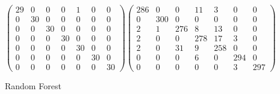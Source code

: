 \documentclass{article}
\begin{document}
\begin{figure}[H]
	\begin{equation}
	\begin{pmatrix}
	29 & 0 & 0 & 0 & 1 & 0 & 0\\
	0 & 30 & 0 & 0 & 0 & 0 & 0\\
	0 & 0 & 30 & 0 & 0 & 0 & 0\\
	0 & 0 & 0 & 30 & 0 & 0 & 0\\
	0 & 0 & 0 & 0 & 30 & 0 & 0\\
	0 & 0 & 0 & 0 & 0 & 30 & 0\\
	0 & 0 & 0 & 0 & 0 & 0 & 30
	\end{pmatrix}
	\begin{pmatrix}
	286 & 0 & 0 & 11 & 3 & 0 & 0\\
	0 & 300 & 0 & 0 & 0 & 0 & 0\\
	2 & 1 & 276 & 8 & 13 & 0 & 0\\
	2 & 0 & 0 & 278 & 17 & 3 & 0\\
	2 & 0 & 31 & 9 & 258 & 0 & 0\\
	0 & 0 & 0 & 6 & 0 & 294 & 0\\
	0 & 0 & 0 & 0 & 0 & 3 & 297
	\end{pmatrix}
	\end{equation}
	\caption{Random Forest}
\end{figure}	
	
\end{document}
